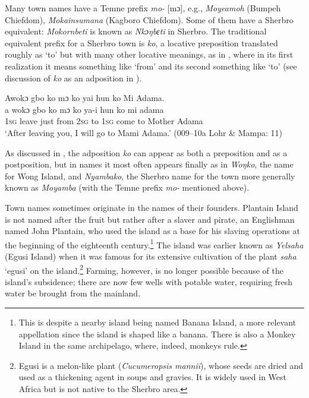 Many town names have a Temne prefix \textit{mo-} [mɔ], e.g., \textit{Moyeamoh} (Bumpeh Chiefdom), \textit{Mokainsumana} (Kagboro Chiefdom). Some of them have a Sherbro equivalent: \textit{Mokornbeti} is known as \textit{Nkɔŋbɛti} in Sherbro. The traditional equivalent prefix for a Sherbro town is \textit{ko}, a locative preposition translated roughly as ‘to' but with many other locative meanings, as in , where in its first realization it means something like ‘from' and its second something like ‘to' (see discussion of \textit{ko} as an adposition in ).

\ea%
    \label{ex:77}
    Awokɔ gbo ko mɔ ko yai hun ko Mi Adama.\\
\gll a    wokɔ    gbo  ko    mɔ  ko    ya-i  hun    ko    mi      adama\\
\textsc{1sg}  leave    just  from  \textsc{2sg}  to    \textsc{1sg}  come    to    Mother  Adama\\
\glt ‘After leaving you, I will go to Mami Adama.' (009--10a Lohr \& Mampa: 11)
\z

As discussed in , the adposition \textit{ko} can appear as both a preposition and as a postposition, but in names it most often appears finally as in \textit{Woŋko}, the name for Wong Island, and \textit{Nyambako}, the Sherbro name for the town more generally known as \textit{Moyamba} (with the Temne prefix \textit{mo-} mentioned above).

Town names sometimes originate in the names of their founders. Plantain Island is not named after the fruit but rather after a slaver and pirate, an Englishman named John Plantain, who used the island as a base for his slaving operations at the beginning of the eighteenth century.\footnote{This is despite a nearby island being named Banana Island, a more relevant appellation since the island is shaped like a banana. There is also a Monkey Island in the same archipelago, where, indeed, monkeys rule.} The island was earlier known as \textit{Yelsaha} (Egusi Island) when it was famous for its extensive cultivation of the plant \textit{saha} ‘egusi' on the island.\footnote{Egusi is a melon-like plant (\textit{Cucumeropsis mannii}), whose seeds are dried and used as a thickening agent in soups and gravies. It is widely used in West Africa but is not native to the Sherbro area.} Farming, however, is no longer possible because of the island's subsidence; there are now few wells with potable water, requiring fresh water be brought from the mainland.

